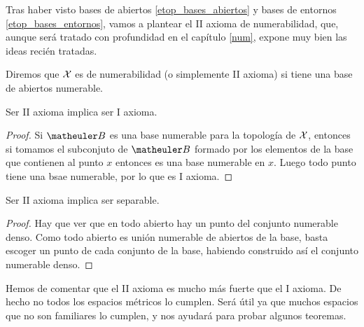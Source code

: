 Tras haber visto bases de abiertos \ref{etop_bases_abiertos} y bases de entornos \ref{etop_bases_entornos}, vamos a plantear el II axioma de numerabilidad, que, aunque será tratado con profundidad en el capítulo \ref{num}, expone muy bien las ideas recién tratadas.
 
\begin{defi}
	\label{etop_2_axioma_num}
	Diremos que $\mathcal{X}$ es  de numerabilidad (o simplemente II axioma) si tiene una base de abiertos numerable.

\end{defi}
\begin{obs}
	Ser II axioma implica ser I axioma. \qedhere
\end{obs}
\begin{proof}
	Si $\B$ es una base numerable para la topología de $\mathcal{X}$, entonces si tomamos el subconjuto de $\B$ formado por los elementos de la base que contienen al punto $x$ entonces es una base numerable en $x$. Luego todo punto tiene una bsae numerable, por lo que es I axioma.
\end{proof}

\begin{obs}
	Ser II axioma implica ser separable. \qedhere
\end{obs}
\begin{proof}
	Hay que ver que en todo abierto hay un punto del conjunto numerable denso. Como todo abierto es unión numerable de abiertos de la base, basta escoger un punto de cada conjunto de la base, habiendo construido así el conjunto numerable denso.
\end{proof}

Hemos de comentar que el II axioma es mucho más fuerte que el I axioma. De hecho no todos los espacios métricos lo cumplen. Será útil ya que muchos espacios que no son familiares lo cumplen, y nos ayudará para probar algunos teoremas. \\

